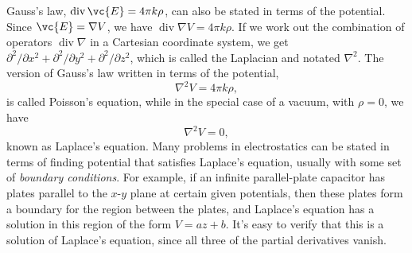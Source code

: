 Gauss's law, $\operatorname{div} \vc{E}=4\pi k \rho$, can also be stated in terms of the potential.
Since $\vc{E} = \nabla V$, we have $\operatorname{div}\nabla V=4\pi k \rho$. If we work out
the combination of operators $\operatorname{div}\nabla$ in a Cartesian coordinate system, we get 
$\partial^2/\partial x^2+\partial^2/\partial y^2+\partial^2/\partial z^2$, which is called
the Laplacian and notated $\nabla^2$.\label{laplacian-em} The version of Gauss's law
written in terms of the potential,
\begin{equation*}
  \nabla^2 V = 4\pi k \rho,
\end{equation*}
is called Poisson's equation, while in the special case of a vacuum, with $\rho=0$, we have
\begin{equation*}
  \nabla^2 V = 0,
\end{equation*}
known as Laplace's equation. Many problems in electrostatics can be stated in terms of
finding  potential that satisfies Laplace's equation, usually with some set of
\emph{boundary conditions}. For example, if an infinite parallel-plate capacitor has plates parallel
to the $x$-$y$ plane at  certain given potentials, then these plates form a boundary for the region
between the plates, and Laplace's equation has a solution in this region of the form
$V=az+b$. It's easy to verify that this is a solution of Laplace's equation, since
all three of the  partial derivatives vanish.
